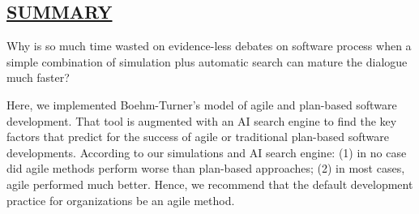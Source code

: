 \begin{kasten}
    \section*{ \hspace{0.1cm} {\color{red} \underline{SUMMARY}}}
    \Large{

%
%
\hspace{6mm}Why is so much time wasted on evidence-less debates on
software process when a simple combination of simulation plus automatic search can mature the dialogue much
faster?

\vspace{3mm}
\hspace{6mm}Here, we implemented Boehm-Turner's model of agile and
plan-based software development. That tool is augmented
with an AI search engine to find the key factors that predict 
for the success of agile or traditional plan-based software 
developments. According to our simulations and AI
search engine: (1) in no case did agile methods perform
worse than plan-based approaches; (2) in most cases, agile performed
much better. Hence, we recommend that the default 
development practice for organizations be an agile
method.
    }
\end{kasten}

